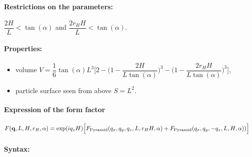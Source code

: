 \paragraph{Restrictions on the parameters:} $\dfrac{2H}{L}< \tan(\alpha)$ and $\dfrac{2r_HH}{L}< \tan(\alpha)$.

\paragraph{Properties:}
\begin{itemize}
\item volume $ V= \dfrac{1}{6} \tan(\alpha)L^3 \Big[ 2
         - \Big(1 - \dfrac{2H }{L\tan(\alpha)} \Big)^3
           - \Big(1 - \dfrac{2 r_H
             H}{L\tan(\alpha) }\Big)^3\Big]$,
\item particle surface seen from above $S =L^2$.
\end{itemize}

\paragraph{Expression of the form factor}
\begin{equation*}
F(\mathbf{q}, L, H, r_H, \alpha)=\exp(iq_z
H)\Big[F_{\rm{Pyramid}}(q_x,q_y, q_z, L, r_H H,
\alpha)+F_{\rm{Pyramid}}(q_x, q_y, -q_z, L, H, \alpha))\Big]
\end{equation*}

\paragraph{Syntax:} 

